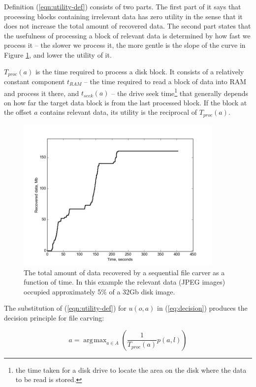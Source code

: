 \documentclass[final,5p,times,twocolumn,authoryear]{elsarticle}
\DeclareMathOperator*{\argmax}{\arg\!\max}
\begin{document}
Definition (\ref{eqn:utility-def}) consists of two parts. The first part of it says that processing blocks containing irrelevant data has zero utility in the sense that it does not increase the total amount of recovered data. The second part states that the usefulness of processing a block of relevant data is determined by how fast we process it -- the slower we process it, the more gentle is the slope of the curve in Figure \ref{fig:sequential}, and lower the utility of it. 

$T_{proc}(a)$ is the time required to process a disk block. It consists of a relatively constant component $t_{RAM}$ -- the time required to read a block of data into RAM and process it there, and $t_{seek}(a)$ -- the drive seek time\footnote{the time taken for a disk drive to locate the area on the disk where the data to be read is stored.} that generally depends on how far the target data block is from the last processed block. If the block at the offset $a$ contains relevant data, its utility is the reciprocal of $T_{proc}(a)$.

\begin{figure}
	\center
	\includegraphics[width=0.9\textwidth]{figures/wc_fig}
	\caption{The total amount of data recovered by a sequential file carver as a function of time. In this example the relevant data (JPEG images) occupied approximately 5\% of a 32Gb disk image.}
	\label{fig:sequential}
\end{figure}

The substitution of  (\ref{eqn:utility-def}) for $u(o,a)$ in (\ref{eq:decision}) produces the decision principle for file carving:

\begin{equation} \label{eq:carving-decision}
a = \argmax_{a \in A} \left( \frac{1}{T_{proc}(a)} p(a,l)\right)
\end{equation}
\end{document}
